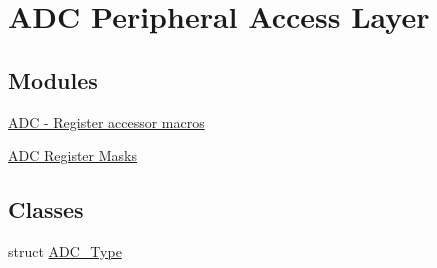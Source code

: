 \hypertarget{group__ADC__Peripheral__Access__Layer}{}\section{A\+DC Peripheral Access Layer}
\label{group__ADC__Peripheral__Access__Layer}
\subsection*{Modules}
\begin{DoxyCompactItemize}
\item 
\hyperlink{group__ADC__Register__Accessor__Macros}{A\+D\+C -\/ Register accessor macros}
\item 
\hyperlink{group__ADC__Register__Masks}{A\+D\+C Register Masks}
\end{DoxyCompactItemize}
\subsection*{Classes}
\begin{DoxyCompactItemize}
\item 
struct \hyperlink{structADC__Type}{A\+D\+C\+\_\+\+Type}
\end{DoxyCompactItemize}

